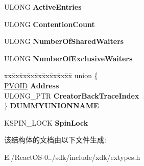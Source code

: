 \begin{DoxyCompactItemize}
\mbox{\label{struct___e_r_e_s_o_u_r_c_e_af5e67e375ce4f56b804a7c58c9ab8cda}} 
U\+L\+O\+NG {\bfseries Active\+Entries}
\item 
\mbox{\label{struct___e_r_e_s_o_u_r_c_e_aa4918dd8aa524c0a051fbd6c7c06b05d}} 
U\+L\+O\+NG {\bfseries Contention\+Count}
\item 
\mbox{\label{struct___e_r_e_s_o_u_r_c_e_a973c8570d4f988fc112c20d71fe9957d}} 
U\+L\+O\+NG {\bfseries Number\+Of\+Shared\+Waiters}
\item 
\mbox{\label{struct___e_r_e_s_o_u_r_c_e_a5f716351d8716a2a3e65dd6eebaec61f}} 
U\+L\+O\+NG {\bfseries Number\+Of\+Exclusive\+Waiters}
\item 
\mbox{\label{struct___e_r_e_s_o_u_r_c_e_a32afea5f46ecc50e156443c070b4ffe4}} 
\begin{tabbing}
xx\=xx\=xx\=xx\=xx\=xx\=xx\=xx\=xx\=\kill
union \{\\
\>\hyperlink{interfacevoid}{PVOID} {\bfseries Address}\\
\>ULONG\_PTR {\bfseries CreatorBackTraceIndex}\\
\} {\bfseries DUMMYUNIONNAME}\\

\end{tabbing}\item 
\mbox{\label{struct___e_r_e_s_o_u_r_c_e_aac55125cfe26c5571cbfd56fa0479604}} 
K\+S\+P\+I\+N\+\_\+\+L\+O\+CK {\bfseries Spin\+Lock}
\end{DoxyCompactItemize}


该结构体的文档由以下文件生成\+:\begin{DoxyCompactItemize}
\item 
E\+:/\+React\+O\+S-\/0../sdk/include/xdk/extypes.\+h\end{DoxyCompactItemize}
